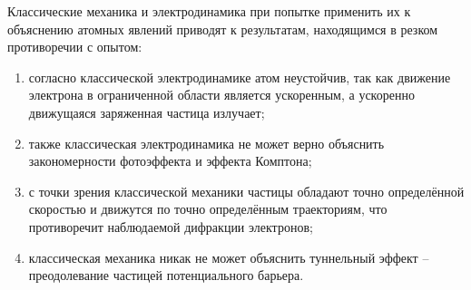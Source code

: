 
Классические механика и электродинамика при попытке применить их к объяснению
атомных явлений приводят к результатам, находящимся в резком противоречии с
опытом:
\begin{enumerate}
    \item согласно классической электродинамике атом неустойчив, так как
        движение электрона в ограниченной области является ускоренным, а
        ускоренно движущаяся заряженная частица излучает;
    \item также классическая электродинамика не может верно объяснить
        закономерности фотоэффекта и эффекта Комптона;
    \item с точки зрения классической механики частицы обладают точно
        определённой скоростью и движутся по точно определённым траекториям, что
        противоречит наблюдаемой дифракции электронов;
    \item классическая механика никак не может объяснить туннельный эффект --
        преодолевание частицей потенциального барьера.
\end{enumerate}
